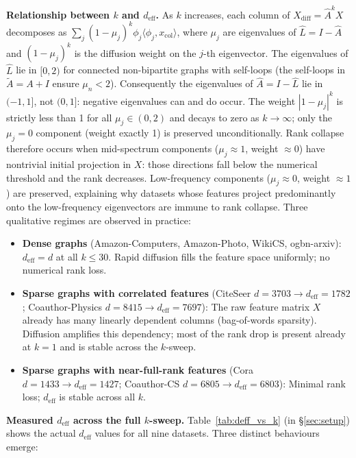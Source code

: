 \documentclass[11pt]{article}
\begin{document}
\textbf{Relationship between $k$ and $d_{\mathrm{eff}}$.}
As $k$ increases, each column of $X_{\mathrm{diff}} = \hat{A}^k X$ decomposes as
$\sum_j (1{-}\mu_j)^k \phi_j \langle \phi_j, x_{\text{col}} \rangle$,
where $\mu_j$ are eigenvalues of $\hat{L} = I - \hat{A}$ and $(1{-}\mu_j)^k$ is the
diffusion weight on the $j$-th eigenvector.
The eigenvalues of $\hat{L}$ lie in $[0, 2)$ for connected non-bipartite graphs with
self-loops (the self-loops in $\tilde{A} = A + I$ ensure $\mu_n < 2$).
Consequently the eigenvalues of $\hat{A} = I - \hat{L}$ lie in $(-1, 1]$, not $(0,1]$:
negative eigenvalues can and do occur.
The weight $|1{-}\mu_j|^k$ is strictly less than 1 for all $\mu_j \in (0, 2)$ and
decays to zero as $k \to \infty$; only the $\mu_j = 0$ component (weight exactly 1)
is preserved unconditionally.
Rank collapse therefore occurs when mid-spectrum components ($\mu_j \approx 1$,
weight $\approx 0$) have nontrivial initial projection in $X$: those directions
fall below the numerical threshold and the rank decreases.
Low-frequency components ($\mu_j \approx 0$, weight $\approx 1$) are preserved,
explaining why datasets whose features project predominantly onto the low-frequency
eigenvectors are immune to rank collapse.
Three qualitative regimes are observed in practice:
\begin{itemize}
  \item \textbf{Dense graphs} (Amazon-Computers, Amazon-Photo, WikiCS, ogbn-arxiv):
    $d_{\mathrm{eff}} = d$ at all $k \leq 30$.  Rapid diffusion fills the feature
    space uniformly; no numerical rank loss.
  \item \textbf{Sparse graphs with correlated features} (CiteSeer $d{=}3703 \to
    d_{\mathrm{eff}}{=}1782$; Coauthor-Physics $d{=}8415 \to d_{\mathrm{eff}}{=}7697$):
    The raw feature matrix $X$ already has many linearly dependent columns
    (bag-of-words sparsity).  Diffusion amplifies this dependency; most of the rank
    drop is present already at $k{=}1$ and is stable across the $k$-sweep.
  \item \textbf{Sparse graphs with near-full-rank features} (Cora $d{=}1433 \to
    d_{\mathrm{eff}}{=}1427$; Coauthor-CS $d{=}6805 \to d_{\mathrm{eff}}{=}6803$):
    Minimal rank loss; $d_{\mathrm{eff}}$ is stable across all $k$.
\end{itemize}
\textbf{Measured $d_{\mathrm{eff}}$ across the full $k$-sweep.}
Table~\ref{tab:deff_vs_k} (in \S\ref{sec:setup}) shows the actual $d_{\mathrm{eff}}$
values for all nine datasets.  Three distinct behaviours emerge:
\end{document}
